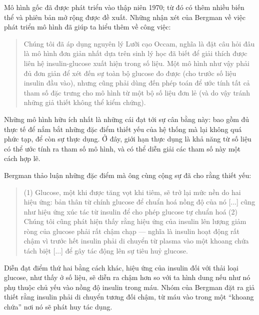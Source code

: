 \documentclass[12pt]{book}
\theoremstyle{exercise}
\begin{document}

Mô hình gốc đã được phát triển vào thập niên 1970; từ đó có thêm nhiều biến thể và phiên bản mở rộng được đề xuất. Những nhận xét của Bergman về việc phát triển mô hình đã giúp ta hiểu thêm về công việc:

\begin{quote}
Chúng tôi đã áp dụng nguyên lý Lưỡi cạo Occam, nghĩa là đặt câu hỏi
đâu là mô hình đơn giản nhất dựa trên sinh lý học đã biết
để giải thích được liên hệ insulin-glucose 
xuất hiện trong số liệu. Một mô hình như vậy phải đủ
đơn giản để xét đến sự toàn bộ glucose đo được (cho trước
số liệu insulin đầu vào), nhưng cũng phải dùng đến
phép toán để ước tính tất cả tham số đặc trưng
cho mô hình từ một bộ số liệu đơn lẻ (và do vậy tránh
những giả thiết không thể kiểm chứng).
\end{quote}

Những mô hình hữu ích nhất là những cái đạt tới sự cân bằng này: bao gồm đủ thực tế để nắm bắt những đặc điểm thiết yếu của hệ thống mà lại không quá phức tạp, để còn sự thực dụng. Ở đây, giới hạn thực dụng là khả năng từ số liệu có thể ước tính ra tham số mô hình, và có thể diễn giải các tham số này một cách hợp lẽ.


Bergman thảo luận những đặc điểm mà ông cùng cộng sự đã cho rằng thiết yếu:

\begin{quote}
(1) Glucose, một khi được tăng vọt khi tiêm, sẽ trở lại mức nền do
hai hiệu ứng: bản thân từ chính glucose để chuẩn hoá nồng độ
của nó [...] cũng như hiệu ứng xúc tác từ insulin để cho phép
glucose tự chuẩn hoá (2) Chúng tôi cũng phát hiện thấy rằng
hiệu ứng của insulin lên lượng giảm ròng của glucose
phải rất chậm chạp --- nghĩa là insulin hoạt động rất chậm vì 
trước hết insulin phải di chuyển từ plasma vào một khoang chứa tách biệt [...] để gây tác động lên sự tiêu huỷ glucose.
\end{quote}

Diễn đạt điểm thứ hai bằng cách khác, hiệu ứng của insulin đối với thải loại glucose, như thấy ở số liệu, sẽ diễn ra chậm hơn so với ta hình dung nếu như nó phụ thuộc chủ yếu vào nồng độ insulin trong máu.  Nhóm của Bergman đặt ra giả thiết rằng insulin phải di chuyển tương đối chậm, từ máu vào trong một ``khoang chứa'' nơi nó sẽ phát huy tác dụng.

\end{document}
